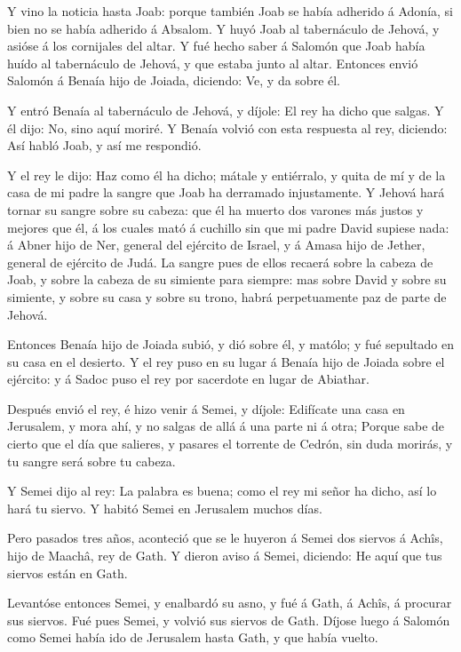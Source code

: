  Y vino la noticia hasta Joab: porque también Joab se había
adherido á Adonía, si bien no se había adherido á Absalom. Y huyó Joab
al tabernáculo de Jehová, y asióse á los cornijales del altar.
 Y fué hecho saber á Salomón que Joab había huído al
tabernáculo de Jehová, y que estaba junto al altar. Entonces envió
Salomón á Benaía hijo de Joiada, diciendo: Ve, y da sobre él.

 Y entró Benaía al tabernáculo de Jehová, y díjole: El rey
ha dicho que salgas. Y él dijo: No, sino aquí moriré. Y Benaía volvió
con esta respuesta al rey, diciendo: Así habló Joab, y así me respondió.

 Y el rey le dijo: Haz como él ha dicho; mátale y
entiérralo, y quita de mí y de la casa de mi padre la sangre que Joab ha
derramado injustamente.  Y Jehová hará tornar su sangre
sobre su cabeza: que él ha muerto dos varones más justos y mejores que
él, á los cuales mató á cuchillo sin que mi padre David supiese nada: á
Abner hijo de Ner, general del ejército de Israel, y á Amasa hijo de
Jether, general de ejército de Judá.  La sangre pues de
ellos recaerá sobre la cabeza de Joab, y sobre la cabeza de su simiente
para siempre: mas sobre David y sobre su simiente, y sobre su casa y
sobre su trono, habrá perpetuamente paz de parte de Jehová.

 Entonces Benaía hijo de Joiada subió, y dió sobre él, y
matólo; y fué sepultado en su casa en el desierto.  Y el
rey puso en su lugar á Benaía hijo de Joiada sobre el ejército: y á
Sadoc puso el rey por sacerdote en lugar de Abiathar.

 Después envió el rey, é hizo venir á Semei, y díjole:
Edifícate una casa en Jerusalem, y mora ahí, y no salgas de allá á una
parte ni á otra;  Porque sabe de cierto que el día que
salieres, y pasares el torrente de Cedrón, sin duda morirás, y tu sangre
será sobre tu cabeza.

 Y Semei dijo al rey: La palabra es buena; como el rey mi
señor ha dicho, así lo hará tu siervo. Y habitó Semei en Jerusalem
muchos días.

 Pero pasados tres años, aconteció que se le huyeron á
Semei dos siervos á Achîs, hijo de Maachâ, rey de Gath. Y dieron aviso á
Semei, diciendo: He aquí que tus siervos están en Gath.

 Levantóse entonces Semei, y enalbardó su asno, y fué á
Gath, á Achîs, á procurar sus siervos. Fué pues Semei, y volvió sus
siervos de Gath.  Díjose luego á Salomón como Semei había
ido de Jerusalem hasta Gath, y que había vuelto.

